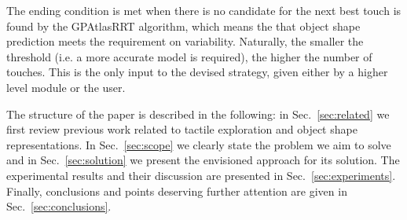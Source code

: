 The ending condition is met when there is no candidate for the next best touch is found by the GPAtlasRRT algorithm, which means the that object shape prediction meets the requirement on variability.
Naturally, the smaller the threshold (i.e. a more accurate model is required), the higher the number of touches. This is the only input to the devised strategy, given either by a higher level module or the user.

The structure of the paper is described in the following: in Sec.~\ref{sec:related} we first review previous work related to tactile exploration and object shape representations. In Sec.~\ref{sec:scope} we clearly state the problem we aim to solve and in Sec.~\ref{sec:solution} we present the envisioned approach for its solution. The experimental results and their discussion are presented in Sec.~\ref{sec:experiments}. Finally, conclusions and points deserving further attention are given in Sec.~\ref{sec:conclusions}.










